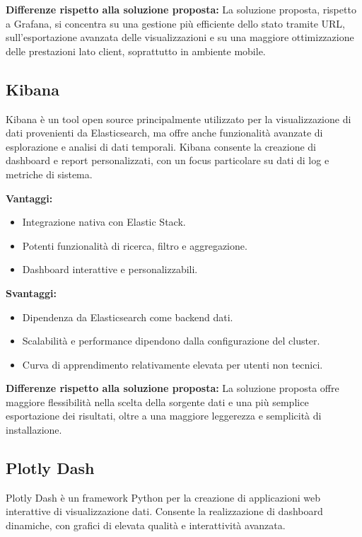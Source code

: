 \textbf{Differenze rispetto alla soluzione proposta:}
La soluzione proposta, rispetto a Grafana, si concentra su una gestione più efficiente dello stato tramite URL, sull’esportazione avanzata delle visualizzazioni e su una maggiore ottimizzazione delle prestazioni lato client, soprattutto in ambiente mobile.

\subsection{Kibana}

Kibana è un tool open source principalmente utilizzato per la visualizzazione di dati provenienti da Elasticsearch, ma offre anche funzionalità avanzate di esplorazione e analisi di dati temporali. Kibana consente la creazione di dashboard e report personalizzati, con un focus particolare su dati di log e metriche di sistema.

\textbf{Vantaggi:}
\begin{itemize}
    \item Integrazione nativa con Elastic Stack.
    \item Potenti funzionalità di ricerca, filtro e aggregazione.
    \item Dashboard interattive e personalizzabili.
\end{itemize}

\textbf{Svantaggi:}
\begin{itemize}
    \item Dipendenza da Elasticsearch come backend dati.
    \item Scalabilità e performance dipendono dalla configurazione del cluster.
    \item Curva di apprendimento relativamente elevata per utenti non tecnici.
\end{itemize}

\textbf{Differenze rispetto alla soluzione proposta:}
La soluzione proposta offre maggiore flessibilità nella scelta della sorgente dati e una più semplice esportazione dei risultati, oltre a una maggiore leggerezza e semplicità di installazione.

\subsection{Plotly Dash}

Plotly Dash è un framework Python per la creazione di applicazioni web interattive di visualizzazione dati. Consente la realizzazione di dashboard dinamiche, con grafici di elevata qualità e interattività avanzata.

